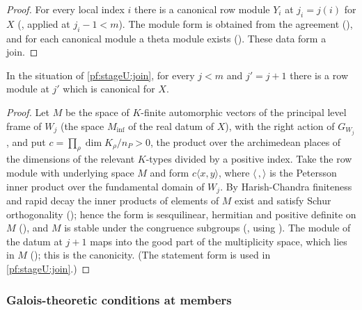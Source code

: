 \begin{proof}
For every local index $i$ there is a canonical row module $Y_i$ at $j_i=j(i)$ for $X$
(, applied at $j_i-1<m$). The module form is obtained from the
agreement (), and for each canonical module a theta module exists
(). These data form a join.
\end{proof}

\begin{lemma}\label{pf:stageU:rowmodcanon}
In the situation of \cref{pf:stageU:join}, for every $j<m$ and $j'=j+1$ there is a row module at $j'$ which is canonical for $X$.
\end{lemma}

\begin{proof}
Let $M$ be the space of $K$-finite automorphic vectors of the principal level frame of $W_j$ (the space $M_{\inf}$ of the
real datum of $X$), with the right action of $G_{W_j}$, and put $c=\prod_\rho\dim K_\rho/n_P>0$, the product over the archimedean
places of the dimensions of the relevant $K$-types divided by a positive index. Take the row module with underlying space $M$
and form $c\langle x,y\rangle$, where $\langle\,,\rangle$ is the Petersson inner product over the fundamental domain of $W_j$. By
Harish-Chandra finiteness and rapid decay the inner products of elements of $M$ exist and satisfy Schur orthogonality
(); hence the form is sesquilinear, hermitian and positive definite on $M$
(), and $M$ is stable under the congruence subgroups
(, using ). The
module of the datum at $j+1$ maps into the good part of the multiplicity space, which lies in $M$
(); this is the canonicity. (The statement form
 is used in \cref{pf:stageU:join}.)
\end{proof}

\subsubsection{Galois-theoretic conditions at members}\label{sec:pf:stageU:galois}

